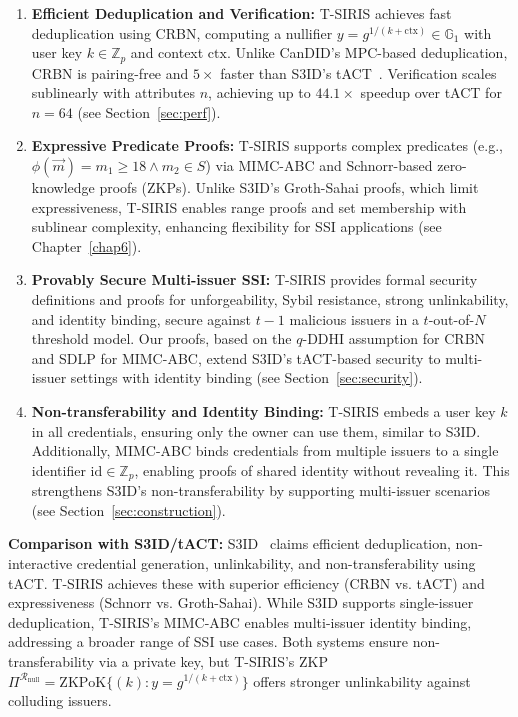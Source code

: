 \begin{enumerate}
    \item \textbf{Efficient Deduplication and Verification:} T-SIRIS achieves fast deduplication using CRBN, computing a nullifier $y = g^{1/(k + \text{ctx})} \in \mathbb{G}_1$ with user key $k \in \mathbb{Z}_p$ and context $\text{ctx}$. Unlike CanDID’s MPC-based deduplication, CRBN is pairing-free and $5\times$ faster than S3ID’s tACT~\cite{rabaninejad_attribute-based_2024}. Verification scales sublinearly with attributes $n$, achieving up to $44.1\times$ speedup over tACT for $n=64$ (see Section~\ref{sec:perf}).
    
    \item \textbf{Expressive Predicate Proofs:} T-SIRIS supports complex predicates (e.g., $\phi(\vec{m}) = m_1 \geq 18 \wedge m_2 \in S$) via MIMC-ABC and Schnorr-based zero-knowledge proofs (ZKPs). Unlike S3ID’s Groth-Sahai proofs, which limit expressiveness, T-SIRIS enables range proofs and set membership with sublinear complexity, enhancing flexibility for SSI applications (see Chapter~\ref{chap6}).
    
    \item \textbf{Provably Secure Multi-issuer SSI:} T-SIRIS provides formal security definitions and proofs for unforgeability, Sybil resistance, strong unlinkability, and identity binding, secure against $t-1$ malicious issuers in a $t$-out-of-$N$ threshold model. Our proofs, based on the $q$-DDHI assumption for CRBN and SDLP for MIMC-ABC, extend S3ID’s tACT-based security to multi-issuer settings with identity binding (see Section~\ref{sec:security}).
    
    \item \textbf{Non-transferability and Identity Binding:} T-SIRIS embeds a user key $k$ in all credentials, ensuring only the owner can use them, similar to S3ID. Additionally, MIMC-ABC binds credentials from multiple issuers to a single identifier $\text{id} \in \mathbb{Z}_p$, enabling proofs of shared identity without revealing it. This strengthens S3ID’s non-transferability by supporting multi-issuer scenarios (see Section~\ref{sec:construction}).
\end{enumerate}

\textbf{Comparison with S3ID/tACT:} S3ID~\cite{rabaninejad_attribute-based_2024} claims efficient deduplication, non-interactive credential generation, unlinkability, and non-transferability using tACT. T-SIRIS achieves these with superior efficiency (CRBN vs. tACT) and expressiveness (Schnorr vs. Groth-Sahai). While S3ID supports single-issuer deduplication, T-SIRIS’s MIMC-ABC enables multi-issuer identity binding, addressing a broader range of SSI use cases. Both systems ensure non-transferability via a private key, but T-SIRIS’s ZKP $\Pi^{\mathcal{R}_{\text{null}}} = \text{ZKPoK}\{(k): y = g^{1/(k + \text{ctx})}\}$ offers stronger unlinkability against colluding issuers.

